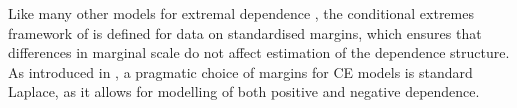 \documentclass[12pt,compact]{article}
\begin{document}
Like many other models for extremal dependence \citep[see, e.g.,][]{Davison2015}, the conditional extremes framework of \citet{Heffernan2004} is defined for data on standardised margins, which ensures that differences in marginal scale do not affect estimation of the dependence structure.
As introduced in \citet{Keef2013}, a pragmatic choice of margins for CE models is standard Laplace, as it allows for modelling of both positive and negative dependence.
\end{document}
